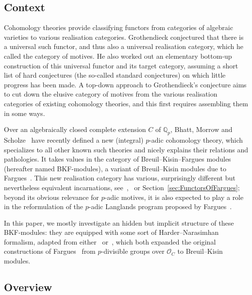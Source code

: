 \documentclass[11pt]{article}
\theoremstyle{definition}
\numberwithin{equation}{section}
\numberwithin{figure}{section}
\numberwithin{table}{section}
\begin{document}
\subsection{Context}

Cohomology theories provide classifying functors from categories of algebraic varieties to various realisation categories. Grothendieck conjectured that there is a universal such functor, and thus also a universal realisation category, which he called the category of motives. He also worked out an elementary bottom-up construction of this universal functor and its target category, assuming a short list of hard conjectures (the so-called standard conjectures) on which little progress has been made. A top-down approach to Grothendieck's conjecture aims to cut down the elusive category of motives from the various realisation categories of existing cohomology theories, and this first requires assembling them in some ways.

Over an algebraically closed complete extension $C$ of $\mathbb{Q}_{p}$, Bhatt, Morrow and Scholze~\cite{BaMoSc16} have recently defined a new (integral) $p$-adic cohomology theory, which specializes to all other known such theories and nicely explains their relations and pathologies. It takes values in the category of Breuil--Kisin--Fargues modules (hereafter named BKF-modules), a variant of Breuil--Kisin modules due to Fargues~\cite{Fa15}. This new realisation category has various, surprisingly different but nevertheless equivalent incarnations, see~\cite[14.1.1]{ScWe15},~\cite[7.5]{Sc17} or Section~\ref{sec:FunctorsOfFargues}; beyond its obvious relevance for $p$-adic motives, it is also expected to play a role in the reformulation of the $p$-adic Langlands program proposed by Fargues~\cite{Fa16}.

In this paper, we mostly investigate an hidden but implicit structure of these BKF-modules: they are equipped with some sort of Harder--Narasimhan formalism, adapted from either~\cite{Imp16} or~\cite{LeWE16}, which both expanded the original constructions of Fargues~\cite{Fa12} from $p$-divisible groups over $\mathcal{O}_{C}$ to Breuil--Kisin modules.

\subsection{Overview}
\end{document}
